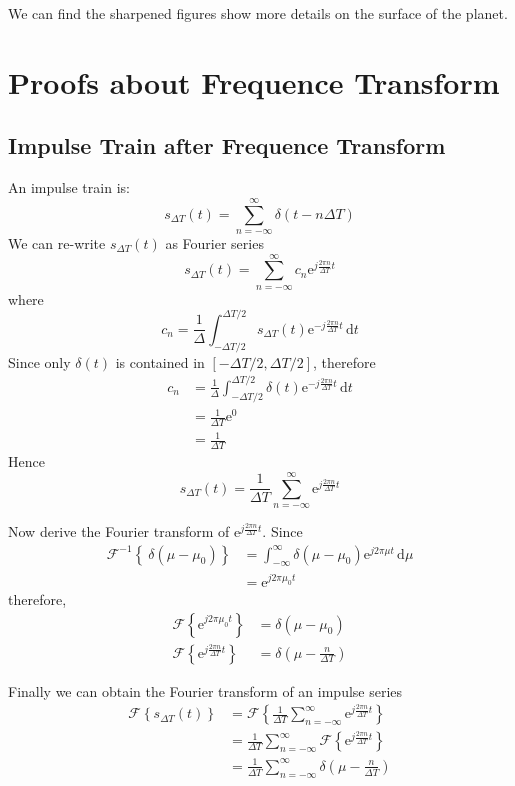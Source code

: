 \documentclass{article}
\begin{document}
We can find the sharpened figures show more details on the surface of the planet.

\section{Proofs about Frequence Transform}
\subsection{Impulse Train after Frequence Transform}
An impulse train is:
\[s_{\Delta T}(t) = \sum_{n=-\infty}^{\infty} \delta(t-n\Delta T) \]
We can re-write  $s_{\Delta T}(t)$ as Fourier series
\[ s_{\Delta T}(t) = \sum_{n=-\infty}^{\infty} c_n \text{e}^{j\frac{2\pi n}{\Delta T}t}  \]
where
\[c_n = \frac{1}{\Delta} \int_{-\Delta T/2}^{\Delta T/2} s_{\Delta T}(t) \text{e}^{-j\frac{2\pi n}{\Delta T}t}\,\text{d}t\]
Since only $\delta(t)$ is contained in $[-\Delta T/2, \Delta T/2]$, therefore
\begin{align*}
c_n &= \frac{1}{\Delta} \int_{-\Delta T/2}^{\Delta T/2} \delta(t) \text{e}^{-j\frac{2\pi n}{\Delta T}t}\,\text{d}t \\
&= \frac{1}{\Delta  T} \text{e}^0 \\
&= \frac{1}{\Delta T}
\end{align*}
Hence
\[s_{\Delta T}(t) = \frac{1}{\Delta T}\sum_{n=-\infty}^{\infty}  \text{e}^{j\frac{2\pi n}{\Delta T}t}\]

Now derive the Fourier transform of $\text{e}^{j\frac{2\pi n}{\Delta T}t}$. Since 
\begin{align*}
    \mathscr{F}^{-1} \left\{\ \delta(\mu-\mu_0) \right\} &= \int_{-\infty}^{\infty}\delta(\mu-\mu_0)\text{e}^{j2\pi\mu t}\, \text{d}\mu\\
    &= \text{e}^{j2\pi\mu_0 t}
\end{align*}
therefore, 
\begin{align*}
    \mathscr{F} \left\{  \text{e}^{j2\pi\mu_0 t} \right\} &= \delta(\mu-\mu_0) \\
    \mathscr{F} \left\{  \text{e}^{j\frac{2\pi n}{\Delta T} t} \right\} &= \delta(\mu-\frac{n}{\Delta T})
\end{align*}

Finally we can obtain the Fourier transform of an impulse series
\begin{align*}
	\mathscr{F} \left\{    s_{\Delta T}(t)   \right\} & = \mathscr{F} \left\{    \frac{1}{\Delta T}\sum_{n=-\infty}^{\infty}  \text{e}^{j\frac{2\pi n}{\Delta T}t}  \right\}  \\
	& = \frac{1}{\Delta T}\sum_{n=-\infty}^{\infty}\mathscr{F} \left\{      \text{e}^{j\frac{2\pi n}{\Delta T}t}  \right\}\\
	& = \frac{1}{\Delta T}  \sum_{n=-\infty}^{\infty} \delta(\mu-\frac{n}{\Delta T})
\end{align*}
	
\end{document}

